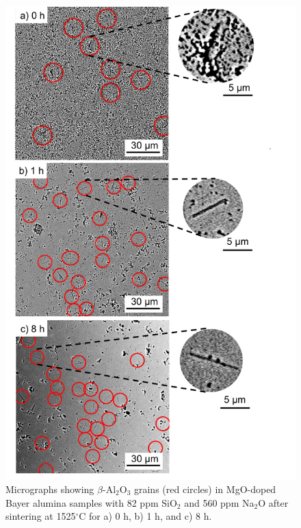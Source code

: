\newpage
\begin{figure}[H]
	\centering
	\includegraphics[scale=0.80]{Chapter-5/Figures/Figure3.png}
	\caption{Micrographs showing $\beta$-Al$_{2}$O$_{3}$ grains (red circles) in MgO-doped Bayer alumina samples with 82 ppm SiO$_{2}$ and 560 ppm Na$_{2}$O after sintering at 1525$^{\circ}$C for a) 0 h, b) 1 h, and c) 8 h.}
	\label{Ch5-figure:Figure3}
\end{figure}

